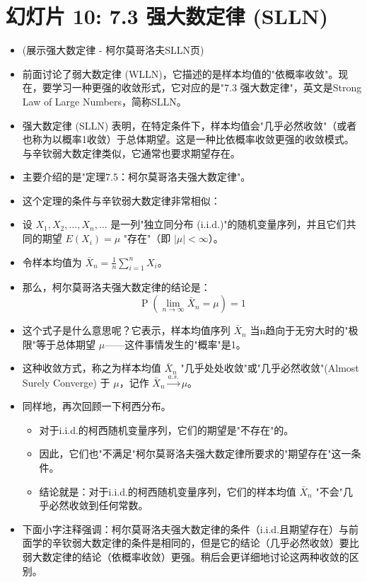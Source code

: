 \documentclass[UTF8]{article} %
\DeclareMathOperator{\Prob}{\operatorname{P}}
\begin{document}
\section*{幻灯片 10: 7.3 强大数定律 (SLLN)}
\begin{itemize}
    \itemsep1em
    \item (展示强大数定律 - 柯尔莫哥洛夫SLLN页)
    \item 前面讨论了弱大数定律 (WLLN)，它描述的是样本均值的"依概率收敛"。现在，要学习一种更强的收敛形式，它对应的是"7.3 强大数定律"，英文是Strong Law of Large Numbers，简称SLLN。
    \item 强大数定律 (SLLN) 表明，在特定条件下，样本均值会"几乎必然收敛"（或者也称为以概率1收敛）于总体期望。这是一种比依概率收敛更强的收敛模式。与辛钦弱大数定律类似，它通常也要求期望存在。
    \item 主要介绍的是"定理7.5：柯尔莫哥洛夫强大数定律"。
    \item 这个定理的条件与辛钦弱大数定律非常相似：
    \item 设 $X_1, X_2, \dots, X_n, \dots$ 是一列"独立同分布 (i.i.d.)"的随机变量序列，并且它们共同的期望 $E(X_i) = \mu$ "存在"（即 $|\mu| < \infty$）。
    \item 令样本均值为 $\bar{X}_n = \frac{1}{n} \sum_{i=1}^{n} X_i$。
    \item 那么，柯尔莫哥洛夫强大数定律的结论是：
    \[ \Prob\left( \lim_{n \to \infty} \bar{X}_n = \mu \right) = 1 \]
    \item 这个式子是什么意思呢？它表示，样本均值序列 $\bar{X}_n$ 当n趋向于无穷大时的"极限"等于总体期望 $\mu$——这件事情发生的"概率"是1。
    \item 这种收敛方式，称之为样本均值 $\bar{X}_n$ "几乎处处收敛"或"几乎必然收敛"(Almost Surely Converge) 于 $\mu$，记作 $\bar{X}_n \xrightarrow{a.s.} \mu$。
    \item 同样地，再次回顾一下柯西分布。
    \begin{itemize}[label=\textbullet, itemsep=0.3em]
        \item 对于i.i.d.的柯西随机变量序列，它们的期望是"不存在"的。
        \item 因此，它们也"不满足"柯尔莫哥洛夫强大数定律所要求的"期望存在"这一条件。
        \item 结论就是：对于i.i.d.的柯西随机变量序列，它们的样本均值 $\bar{X}_n$ "不会"几乎必然收敛到任何常数。
    \end{itemize}
    \item 下面小字注释强调：柯尔莫哥洛夫强大数定律的条件（i.i.d.且期望存在）与前面学的辛钦弱大数定律的条件是相同的，但是它的结论（几乎必然收敛）要比弱大数定律的结论（依概率收敛）更强。稍后会更详细地讨论这两种收敛的区别。
\end{itemize}
\end{document}

